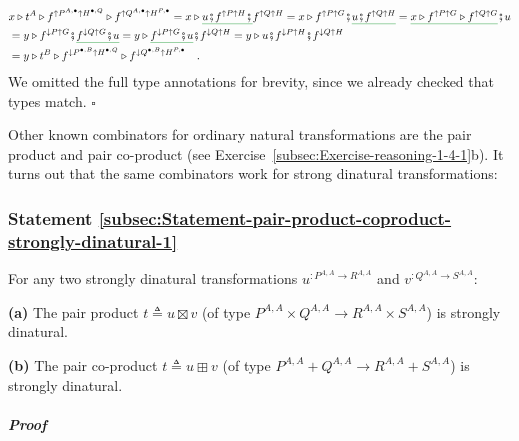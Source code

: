 \begin{align*}
 & x\triangleright t^{A}\triangleright f^{\uparrow P^{A,\bullet}\uparrow H^{\bullet,Q}}\triangleright f^{\uparrow Q^{A,\bullet}\uparrow H^{P,\bullet}}=x\triangleright\gunderline{u\bef f^{\uparrow P\uparrow H}\bef}f^{\uparrow Q\uparrow H}=x\triangleright f^{\uparrow P\uparrow G}\bef\gunderline{u\bef f^{\uparrow Q\uparrow H}}=\gunderline{x\triangleright f^{\uparrow P\uparrow G}\triangleright f^{\uparrow Q\uparrow G}}\bef u\\
 & =y\triangleright f^{\downarrow P\uparrow G}\bef\gunderline{f^{\downarrow Q\uparrow G}\bef u}=y\triangleright\gunderline{f^{\downarrow P\uparrow G}\bef u}\bef f^{\downarrow Q\uparrow H}=y\triangleright u\bef f^{\downarrow P\uparrow H}\bef f^{\downarrow Q\uparrow H}\\
 & =y\triangleright t^{B}\triangleright f^{\downarrow P^{\bullet,B}\uparrow H^{\bullet,Q}}\triangleright f^{\downarrow Q^{\bullet,B}\uparrow H^{P,\bullet}}\quad.
\end{align*}
We omitted the full type annotations for brevity, since we already
checked that types match. $\square$

Other known combinators for ordinary natural transformations are the
pair product and pair co-product (see Exercise~\ref{subsec:Exercise-reasoning-1-4-1}b).
It turns out that the same combinators work for strong dinatural transformations:

\subsubsection{Statement \label{subsec:Statement-pair-product-coproduct-strongly-dinatural-1}\ref{subsec:Statement-pair-product-coproduct-strongly-dinatural-1}}

For any two strongly dinatural transformations $u^{:P^{A,A}\rightarrow R^{A,A}}$
and $v^{:Q^{A,A}\rightarrow S^{A,A}}$:

\textbf{(a)} The pair product $t\triangleq u\boxtimes v$ (of type
$P^{A,A}\times Q^{A,A}\rightarrow R^{A,A}\times S^{A,A}$) is strongly
dinatural.

\textbf{(b)} The pair co-product
$t\triangleq u\boxplus v$ (of type $P^{A,A}+Q^{A,A}\rightarrow R^{A,A}+S^{A,A}$)
is strongly dinatural.

\subparagraph{Proof}

